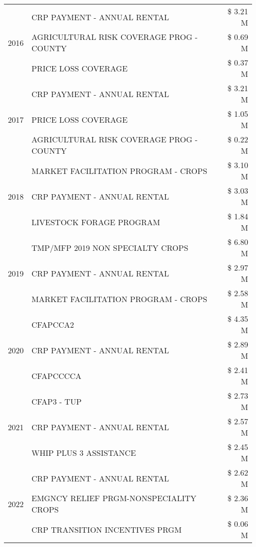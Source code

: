 \begin{tabular}{llr}
\cline{1-3}
\multirow[t]{3}{*}{2016} & CRP PAYMENT - ANNUAL RENTAL & \$ 3.21 M \\
 & AGRICULTURAL RISK COVERAGE PROG - COUNTY & \$ 0.69 M \\
 & PRICE LOSS COVERAGE & \$ 0.37 M \\
\cline{1-3}
\multirow[t]{3}{*}{2017} & CRP PAYMENT - ANNUAL RENTAL & \$ 3.21 M \\
 & PRICE LOSS COVERAGE & \$ 1.05 M \\
 & AGRICULTURAL RISK COVERAGE PROG - COUNTY & \$ 0.22 M \\
\cline{1-3}
\multirow[t]{3}{*}{2018} & MARKET FACILITATION PROGRAM - CROPS & \$ 3.10 M \\
 & CRP PAYMENT - ANNUAL RENTAL & \$ 3.03 M \\
 & LIVESTOCK FORAGE PROGRAM & \$ 1.84 M \\
\cline{1-3}
\multirow[t]{3}{*}{2019} & TMP/MFP 2019 NON SPECIALTY CROPS & \$ 6.80 M \\
 & CRP PAYMENT - ANNUAL RENTAL & \$ 2.97 M \\
 & MARKET FACILITATION PROGRAM - CROPS & \$ 2.58 M \\
\cline{1-3}
\multirow[t]{3}{*}{2020} & CFAPCCA2 & \$ 4.35 M \\
 & CRP PAYMENT - ANNUAL RENTAL & \$ 2.89 M \\
 & CFAPCCCCA & \$ 2.41 M \\
\cline{1-3}
\multirow[t]{3}{*}{2021} & CFAP3 - TUP & \$ 2.73 M \\
 & CRP PAYMENT - ANNUAL RENTAL & \$ 2.57 M \\
 & WHIP PLUS 3 ASSISTANCE & \$ 2.45 M \\
\cline{1-3}
\multirow[t]{3}{*}{2022} & CRP PAYMENT - ANNUAL RENTAL & \$ 2.62 M \\
 & EMGNCY RELIEF PRGM-NONSPECIALITY CROPS & \$ 2.36 M \\
 & CRP TRANSITION INCENTIVES PRGM & \$ 0.06 M \\
\cline{1-3}
\bottomrule
\end{tabular}

